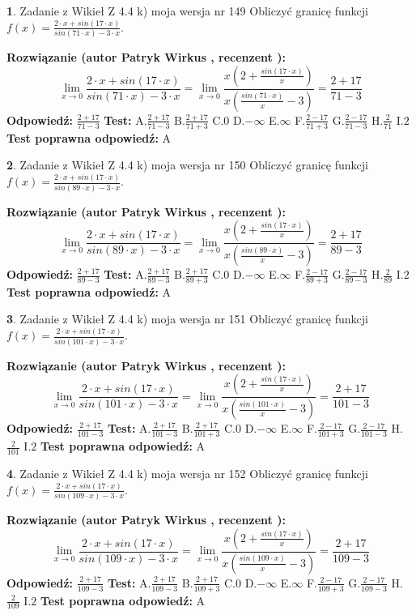 \documentclass[12pt, a4paper]{article}
\theoremstyle{definition} %
\newtheorem{zad}{}
\newcommand{\zadStart}[1]{\begin{zad}#1\newline}
\newcommand{\zadStop}{\end{zad}}
\newcommand{\rozwStart}[2]{\noindent \textbf{Rozwiązanie (autor #1 , recenzent #2): }\newline}
\newcommand{\rozwStop}{\newline}
\newcommand{\odpStart}{\noindent \textbf{Odpowiedź:}\newline}
\newcommand{\odpStop}{\newline}
\newcommand{\testStart}{\noindent \textbf{Test:}\newline}
\newcommand{\testStop}{\newline}
\newcommand{\kluczStart}{\noindent \textbf{Test poprawna odpowiedź:}\newline}
\newcommand{\kluczStop}{\newline}
\begin{document}
\zadStart{Zadanie z Wikieł Z 4.4 k) moja wersja nr 149}
Obliczyć granicę funkcji $f(x)=\frac{2\cdot x +sin(17\cdot x)}{sin(71\cdot x) -3\cdot x}$.
\zadStop
\rozwStart{Patryk Wirkus}{}
$$\lim\limits_{x\to 0}\frac{2\cdot x +sin(17\cdot x)}{sin(71\cdot x) -3\cdot x}
=\lim\limits_{x\to 0}\frac{x(2+\frac{sin(17\cdot x)}{x})}{x(\frac{sin(71\cdot x)}{x}-3)}
=\frac{2+17}{71-3}$$
\rozwStop
\odpStart
$\frac{2+17}{71-3}$
\odpStop
\testStart
A.$\frac{2+17}{71-3}$
B.$\frac{2+17}{71+3}$
C.$0$
D.$-\infty$
E.$\infty$
F.$\frac{2-17}{71+3}$
G.$\frac{2-17}{71-3}$
H.$\frac{2}{71}$
I.$2$
\testStop
\kluczStart
A
\kluczStop



\zadStart{Zadanie z Wikieł Z 4.4 k) moja wersja nr 150}
Obliczyć granicę funkcji $f(x)=\frac{2\cdot x +sin(17\cdot x)}{sin(89\cdot x) -3\cdot x}$.
\zadStop
\rozwStart{Patryk Wirkus}{}
$$\lim\limits_{x\to 0}\frac{2\cdot x +sin(17\cdot x)}{sin(89\cdot x) -3\cdot x}
=\lim\limits_{x\to 0}\frac{x(2+\frac{sin(17\cdot x)}{x})}{x(\frac{sin(89\cdot x)}{x}-3)}
=\frac{2+17}{89-3}$$
\rozwStop
\odpStart
$\frac{2+17}{89-3}$
\odpStop
\testStart
A.$\frac{2+17}{89-3}$
B.$\frac{2+17}{89+3}$
C.$0$
D.$-\infty$
E.$\infty$
F.$\frac{2-17}{89+3}$
G.$\frac{2-17}{89-3}$
H.$\frac{2}{89}$
I.$2$
\testStop
\kluczStart
A
\kluczStop



\zadStart{Zadanie z Wikieł Z 4.4 k) moja wersja nr 151}
Obliczyć granicę funkcji $f(x)=\frac{2\cdot x +sin(17\cdot x)}{sin(101\cdot x) -3\cdot x}$.
\zadStop
\rozwStart{Patryk Wirkus}{}
$$\lim\limits_{x\to 0}\frac{2\cdot x +sin(17\cdot x)}{sin(101\cdot x) -3\cdot x}
=\lim\limits_{x\to 0}\frac{x(2+\frac{sin(17\cdot x)}{x})}{x(\frac{sin(101\cdot x)}{x}-3)}
=\frac{2+17}{101-3}$$
\rozwStop
\odpStart
$\frac{2+17}{101-3}$
\odpStop
\testStart
A.$\frac{2+17}{101-3}$
B.$\frac{2+17}{101+3}$
C.$0$
D.$-\infty$
E.$\infty$
F.$\frac{2-17}{101+3}$
G.$\frac{2-17}{101-3}$
H.$\frac{2}{101}$
I.$2$
\testStop
\kluczStart
A
\kluczStop



\zadStart{Zadanie z Wikieł Z 4.4 k) moja wersja nr 152}
Obliczyć granicę funkcji $f(x)=\frac{2\cdot x +sin(17\cdot x)}{sin(109\cdot x) -3\cdot x}$.
\zadStop
\rozwStart{Patryk Wirkus}{}
$$\lim\limits_{x\to 0}\frac{2\cdot x +sin(17\cdot x)}{sin(109\cdot x) -3\cdot x}
=\lim\limits_{x\to 0}\frac{x(2+\frac{sin(17\cdot x)}{x})}{x(\frac{sin(109\cdot x)}{x}-3)}
=\frac{2+17}{109-3}$$
\rozwStop
\odpStart
$\frac{2+17}{109-3}$
\odpStop
\testStart
A.$\frac{2+17}{109-3}$
B.$\frac{2+17}{109+3}$
C.$0$
D.$-\infty$
E.$\infty$
F.$\frac{2-17}{109+3}$
G.$\frac{2-17}{109-3}$
H.$\frac{2}{109}$
I.$2$
\testStop
\kluczStart
A
\kluczStop
\end{document}
